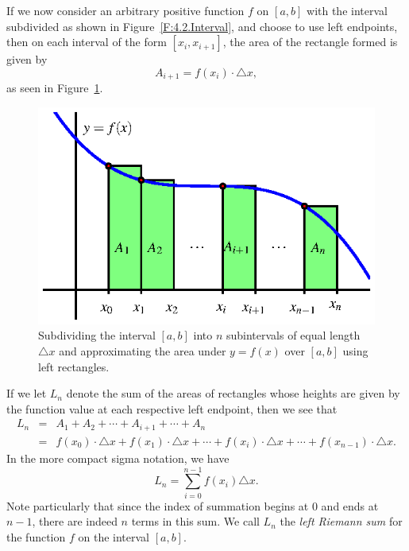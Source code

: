If we now consider an arbitrary positive function $f$ on $[a,b]$ with the interval subdivided as shown in Figure~\ref{F:4.2.Interval}, and choose to use left endpoints, then on each interval of the form $[x_{i}, x_{i+1}]$, the area of the rectangle formed is given by
$$A_{i+1} = f(x_i) \cdot \triangle x,$$
as seen in Figure~\ref{F:4.2.LeftSum}.
\begin{figure}[h]
\begin{center}
\includegraphics{figures/4_2_LeftSum.eps}
\caption{Subdividing the interval $[a,b]$ into $n$ subintervals of equal length $\triangle x$ and approximating the area under $y = f(x)$ over $[a,b]$ using left rectangles.} \label{F:4.2.LeftSum}
\end{center}
\end{figure}
If we let $L_n$ denote the sum of the areas of rectangles whose heights are given by the function value at each respective left endpoint, then we see that
\begin{eqnarray*}
L_n & = & A_1 + A_2 + \cdots + A_{i+1} + \cdots + A_n \\
	& = & f(x_0) \cdot \triangle x + f(x_1) \cdot \triangle x + \cdots + f(x_i) \cdot \triangle x + \cdots + f(x_{n-1}) \cdot \triangle x.
\end{eqnarray*}
In the more compact sigma notation, we have 
$$L_n = \sum_{i = 0}^{n-1} f(x_i) \triangle x.$$
Note particularly that since the index of summation begins at $0$ and ends at $n-1$, there are indeed $n$ terms in this sum.  We call $L_n$ the \emph{left Riemann sum}   for the function $f$ on the interval $[a,b]$.

